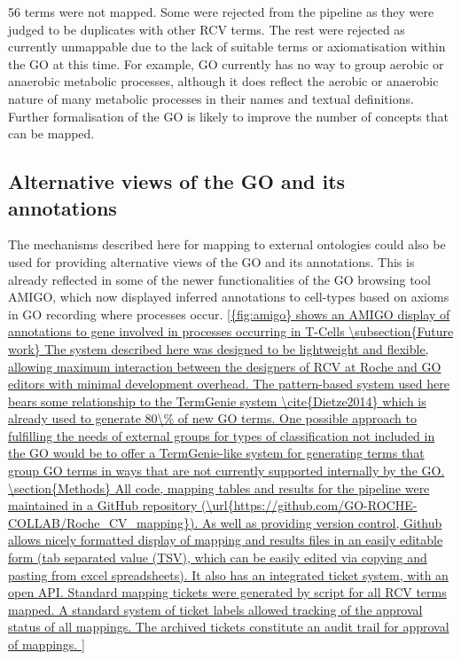 \documentclass[runningheads,a4paper]{llncs}
\begin{document}
{{56 terms were not mapped.  Some were rejected from the pipeline as they were judged to be duplicates with other RCV terms.  The rest were rejected as currently unmappable due to the lack of suitable terms or axiomatisation within the GO at this time.  For example, GO currently has no way to group aerobic or anaerobic metabolic processes, although it does reflect the aerobic or anaerobic nature of many metabolic processes in their names and textual definitions. Further formalisation of the GO is likely to improve the number of concepts that can be mapped.

\subsection{Alternative views of the GO and its annotations}

The mechanisms described here for mapping to external ontologies could also be used for providing alternative views of the GO and its annotations.  This is already reflected in some of the newer functionalities of the GO browsing tool AMIGO, which now displayed inferred annotations to cell-types based on axioms in GO recording where processes occur.  \ref{{fig:amigo} shows an AMIGO display of annotations to gene involved in processes occurring in T-Cells

\subsection{Future work}

The system described here was designed to be lightweight and flexible, allowing maximum interaction between the designers of RCV at Roche and GO editors with minimal development overhead.

The pattern-based system used here bears some relationship to the TermGenie system \cite{Dietze2014} which is already used to generate 80\% of new GO terms.  One possible approach to fulfilling the needs of external groups for types of classification not included in the GO would be to offer a TermGenie-like system for generating terms that group GO terms in ways that are not currently supported internally by the GO.


\section{Methods}

All code, mapping tables and results for the pipeline were maintained in a GitHub repository (\url{https://github.com/GO-ROCHE-COLLAB/Roche_CV_mapping}). As well as providing version control, Github allows nicely formatted display of mapping and results files in an easily editable form (tab separated value (TSV), which can be easily edited via copying and pasting from excel spreadsheets). It also has an integrated ticket system, with an open API.  Standard mapping tickets were generated by script for all RCV terms mapped. A standard system of ticket labels allowed tracking of the approval status of all mappings.  The archived tickets constitute an audit trail for approval of mappings.

}}}
\end{document}

